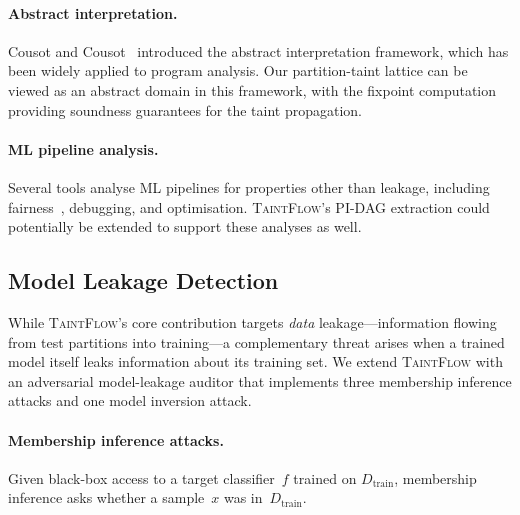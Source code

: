 \documentclass[11pt]{article}
\begin{document}
\paragraph{Abstract interpretation.}
Cousot and Cousot~\cite{cousot1977} introduced the abstract
interpretation framework, which has been widely applied to program
analysis.  Our partition-taint lattice can be viewed as an abstract
domain in this framework, with the fixpoint computation providing
soundness guarantees for the taint propagation.

\paragraph{ML pipeline analysis.}
Several tools analyse ML pipelines for properties other than leakage,
including fairness~\cite{pedregosa2011}, debugging, and
optimisation.  \textsc{TaintFlow}'s PI-DAG extraction could
potentially be extended to support these analyses as well.

\subsection{Model Leakage Detection}\label{sec:model-leakage}

While \textsc{TaintFlow}'s core contribution targets \emph{data}
leakage---information flowing from test partitions into training---a
complementary threat arises when a trained model itself leaks
information about its training set.  We extend \textsc{TaintFlow}
with an adversarial model-leakage auditor that implements three
membership inference attacks and one model inversion attack.

\paragraph{Membership inference attacks.}
Given black-box access to a target classifier~$f$ trained on
$D_{\mathrm{train}}$, membership inference asks whether a sample~$x$
was in~$D_{\mathrm{train}}$.
\end{document}
